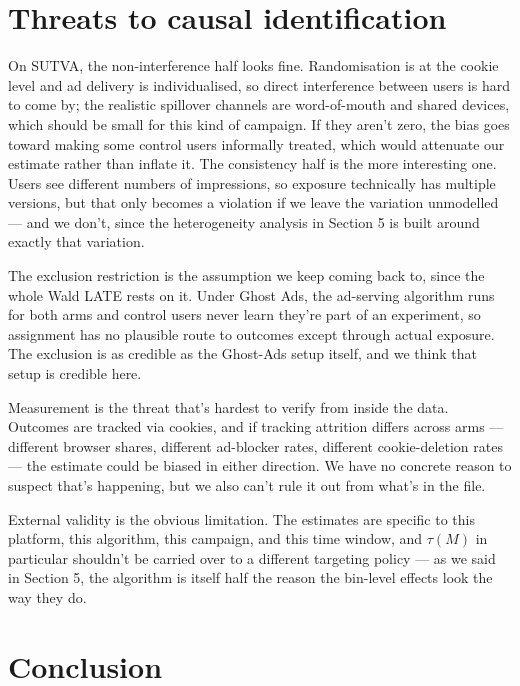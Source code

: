 \documentclass[
  letterpaper,
  DIV=11,
  numbers=noendperiod]{scrartcl}
\begin{document}
\section{Threats to causal
identification}\label{threats-to-causal-identification}

On SUTVA, the non-interference half looks fine. Randomisation is at the
cookie level and ad delivery is individualised, so direct interference
between users is hard to come by; the realistic spillover channels are
word-of-mouth and shared devices, which should be small for this kind of
campaign. If they aren't zero, the bias goes toward making some control
users informally treated, which would attenuate our estimate rather than
inflate it. The consistency half is the more interesting one. Users see
different numbers of impressions, so exposure technically has multiple
versions, but that only becomes a violation if we leave the variation
unmodelled --- and we don't, since the heterogeneity analysis in Section
5 is built around exactly that variation.

The exclusion restriction is the assumption we keep coming back to,
since the whole Wald LATE rests on it. Under Ghost Ads, the ad-serving
algorithm runs for both arms and control users never learn they're part
of an experiment, so assignment has no plausible route to outcomes
except through actual exposure. The exclusion is as credible as the
Ghost-Ads setup itself, and we think that setup is credible here.

Measurement is the threat that's hardest to verify from inside the data.
Outcomes are tracked via cookies, and if tracking attrition differs
across arms --- different browser shares, different ad-blocker rates,
different cookie-deletion rates --- the estimate could be biased in
either direction. We have no concrete reason to suspect that's
happening, but we also can't rule it out from what's in the file.

External validity is the obvious limitation. The estimates are specific
to this platform, this algorithm, this campaign, and this time window,
and \(\tau(M)\) in particular shouldn't be carried over to a different
targeting policy --- as we said in Section 5, the algorithm is itself
half the reason the bin-level effects look the way they do.

\section{Conclusion}\label{conclusion}
\end{document}
